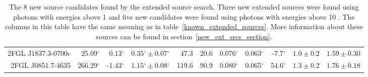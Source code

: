 \documentclass[12pt,preprint]{aastex}
\newcommand{\gev}{\text{GeV}\xspace}
\renewcommand{\deg}{\ensuremath{^\circ}\xspace}
\begin{document}
\begin{table}
\begin{centering}
\begin{tabular}{r|rrrrrrrrrr}
      2FGL J1837.3-0700c         &      25.09\deg &       0.13\deg & $  0.35\deg \pm   0.07\deg$ &     47.3 &       20.6 &  0.076\deg &  0.063\deg &   -7.7\deg & $    1.0 \pm     0.2$ & $   1.59 \pm    0.30$ \\
      2FGL J0851.7-4635          &     266.29\deg &      -1.43\deg & $  1.15\deg \pm   0.08\deg$ &    119.6 &       90.9 &  0.080\deg &  0.065\deg &   54.6\deg & $    1.3 \pm     0.2$ & $   1.76 \pm    0.18$ \\
      \hline
    \end{tabular}
    \caption{The 8 new source candidates found by the extended source
    search. Three new extended sources were found using photons with
    energies above 1 \gev and five new candidates were found using photons
    with energies above 10 \gev.  The columns in this table have the same
    meaning as in table~\ref{known_extended_sources}.  More information
    about these sources can be found in section~\ref{new_ext_srcs_section}.
    }
    \label{new_ext_srcs_table}
  \end{centering}
\end{table}
\end{document}
